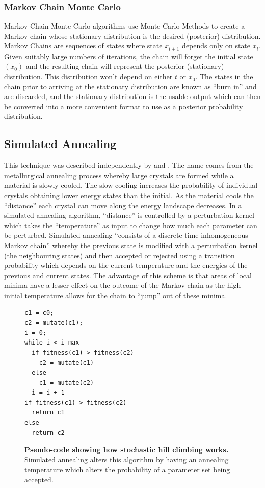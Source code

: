 \subsubsection{Markov Chain Monte Carlo}
Markov Chain Monte Carlo algorithms use Monte Carlo Methods to create a Markov chain whose stationary distribution is the desired (posterior) distribution. Markov Chains are sequences of states where state $x_{t+1}$ depends only on state $x_t$. Given suitably large numbers of iterations, the chain will forget the initial state $(x_0)$ and the resulting chain will represent the posterior (stationary) distribution. This distribution won't depend on either $t$ or $x_0$\cite{Gilks1996}. The states in the chain prior to arriving at the stationary distribution are known as ``burn in'' and are discarded, and the stationary distribution is the usable output which can then be converted into a more convenient format to use as a posterior probability distribution.

\subsection{Simulated Annealing}
This technique was described independently by \citet{Kirkpatrick1983} and \citet{Cerny1985}. The name comes from the metallurgical annealing process whereby large crystals are formed while a material is slowly cooled. The slow cooling increases the probability of individual crystals obtaining lower energy states than the initial. As the material cools the ``distance'' each crystal can move along the energy landscape decreases. In a simulated annealing algorithm, ``distance'' is controlled by a perturbation kernel which takes the ``temperature'' as input to change how much each parameter can be perturbed.
Simulated annealing ``consists of a discrete-time inhomogeneous Markov chain''\cite{Bertsimas1993} whereby the previous state is modified with a perturbation kernel (the neighbouring states) and then accepted or rejected using a transition probability which depends on the current temperature and the energies of the previous and current states. The advantage of this scheme is that areas of local minima have a lesser effect on the outcome of the Markov chain as the high initial temperature allows for the chain to ``jump'' out of these minima.

\begin{figure}[htbp]
\small
\begin{verbatim}
c1 = c0;
c2 = mutate(c1);
i = 0;
while i < i_max
  if fitness(c1) > fitness(c2)
    c2 = mutate(c1)
  else
    c1 = mutate(c2)
  i = i + 1
if fitness(c1) > fitness(c2)
  return c1
else
  return c2
\end{verbatim}
\caption[Pseudo-code showing how stochastic hill climbing works.]{{\bf Pseudo-code showing how stochastic hill climbing works.} Simulated annealing alters this algorithm by having an annealing temperature which alters the probability of a parameter set being accepted.
\label{fig:sa_code}}
\end{figure}

